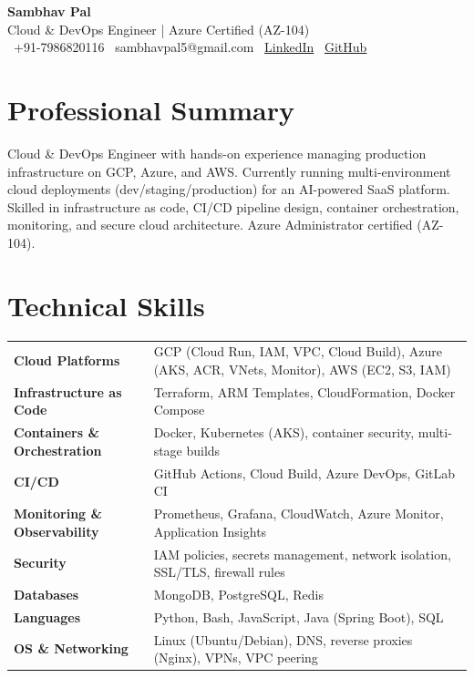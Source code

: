 \documentclass[a4paper,10pt]{article}
\begin{document}
\begin{center}
    {\LARGE\bfseries Sambhav Pal} \\[4pt]
    {\color{subtext} Cloud \& DevOps Engineer | Azure Certified (AZ-104)} \\[6pt]
    \faPhone\ +91-7986820116 \quad
    \faEnvelope\ sambhavpal5@gmail.com \quad
    \faLinkedin\ \href{https://linkedin.com/in/sambhavpal}{LinkedIn} \quad
    \faGithub\ \href{https://github.com/sambhavpal}{GitHub}
\end{center}

\section{Professional Summary}
Cloud \& DevOps Engineer with hands-on experience managing production infrastructure on GCP, Azure, and AWS. Currently running multi-environment cloud deployments (dev/staging/production) for an AI-powered SaaS platform. Skilled in infrastructure as code, CI/CD pipeline design, container orchestration, monitoring, and secure cloud architecture. Azure Administrator certified (AZ-104).

\section{Technical Skills}
\begin{tabular}{@{}l l@{}}
\textbf{Cloud Platforms} & GCP (Cloud Run, IAM, VPC, Cloud Build), Azure (AKS, ACR, VNets, Monitor), AWS (EC2, S3, IAM) \\
\textbf{Infrastructure as Code} & Terraform, ARM Templates, CloudFormation, Docker Compose \\
\textbf{Containers \& Orchestration} & Docker, Kubernetes (AKS), container security, multi-stage builds \\
\textbf{CI/CD} & GitHub Actions, Cloud Build, Azure DevOps, GitLab CI \\
\textbf{Monitoring \& Observability} & Prometheus, Grafana, CloudWatch, Azure Monitor, Application Insights \\
\textbf{Security} & IAM policies, secrets management, network isolation, SSL/TLS, firewall rules \\
\textbf{Databases} & MongoDB, PostgreSQL, Redis \\
\textbf{Languages} & Python, Bash, JavaScript, Java (Spring Boot), SQL \\
\textbf{OS \& Networking} & Linux (Ubuntu/Debian), DNS, reverse proxies (Nginx), VPNs, VPC peering \\
\end{tabular}
\end{document}

